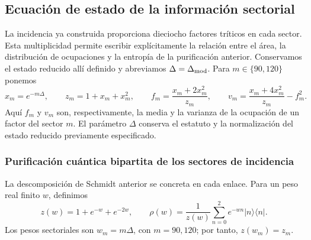 \subsection{Ecuación de estado de la información sectorial}
\label{v:v:ant:sec:ii-ecuacion-informacion}

La incidencia ya construida proporciona dieciocho factores tríticos en
cada sector. Esta multiplicidad permite escribir explícitamente la
relación entre el área, la distribución de ocupaciones y la entropía de
la purificación anterior. Conservamos el estado reducido allí definido
y abreviamos $\Delta=\Delta_{\rm mod}$. Para $m\in\{90,120\}$ ponemos
\begin{equation}
 x_m=e^{-m\Delta},\qquad z_m=1+x_m+x_m^2,\qquad
 f_m=\frac{x_m+2x_m^2}{z_m},\qquad
 v_m=\frac{x_m+4x_m^2}{z_m}-f_m^2.
 \label{v:v:ant:eq:ii-sector-momentos}
\end{equation}
Aquí $f_m$ y $v_m$ son, respectivamente, la media y la varianza de
la ocupación de un factor del sector $m$. El parámetro $\Delta$ conserva
el estatuto y la normalización del estado reducido previamente
especificado.

\subsubsection{Purificación cuántica bipartita de los sectores de incidencia}
\label{v:v:ant:sec:ii-area-purificacion-producto}

La descomposición de Schmidt anterior se concreta en cada enlace.
Para un peso real finito \(w\), definimos
\[
 z(w)=1+e^{-w}+e^{-2w},\qquad
 \rho(w)=\frac1{z(w)}\sum_{n=0}^2e^{-wn}|n\rangle\langle n|.
\]
Los pesos sectoriales son \(w_m=m\Delta\), con \(m=90,120\);
por tanto, \(z(w_m)=z_m\).

